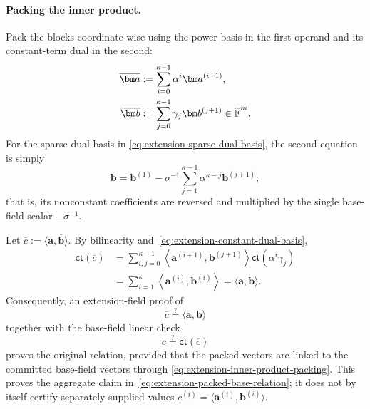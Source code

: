 \documentclass[runningheads]{llncs}
\begin{document}
\paragraph{Packing the inner product.}
Pack the blocks coordinate-wise using the power basis in the first
operand and its constant-term dual in the second:
\begin{equation}
\begin{aligned}
    \overline{\bm a}
      &:=\sum_{i=0}^{\kappa-1}
        \alpha^i\bm a^{(i+1)},\\
    \overline{\bm b}
      &:=\sum_{j=0}^{\kappa-1}
        \gamma_j\bm b^{(j+1)}
       \in\overline{\Field}^{m}.
\end{aligned}
\label{eq:extension-inner-product-packing}
\end{equation}
For the sparse dual basis in
\eqref{eq:extension-sparse-dual-basis}, the second equation is simply
\[
    \overline{\bm b}
      =\bm b^{(1)}
       -\sigma^{-1}
        \sum_{j=1}^{\kappa-1}
        \alpha^{\kappa-j}\bm b^{(j+1)};
\]
that is, its nonconstant coefficients are reversed and multiplied by
the single base-field scalar \(-\sigma^{-1}\).

Let
\(\overline c:=\langle\overline{\bm a},\overline{\bm b}\rangle\).
By bilinearity and~\eqref{eq:extension-constant-dual-basis},
\begin{equation}
\begin{aligned}
    \mathsf{ct}(\overline c)
      &=\sum_{i,j=0}^{\kappa-1}
        \left\langle
          \bm a^{(i+1)},\bm b^{(j+1)}
        \right\rangle
        \mathsf{ct}(\alpha^i\gamma_j)\\
      &=\sum_{i=1}^{\kappa}
        \left\langle\bm a^{(i)},\bm b^{(i)}\right\rangle
       =\langle\bm a,\bm b\rangle.
\end{aligned}
\label{eq:extension-inner-product-constant-term}
\end{equation}
Consequently, an extension-field proof of
\[
    \overline c
      \stackrel{?}{=}
      \langle\overline{\bm a},\overline{\bm b}\rangle
\]
together with the base-field linear check
\[
    c\stackrel{?}{=}\mathsf{ct}(\overline c)
\]
proves the original relation, provided that the packed vectors are
linked to the committed base-field vectors through
\eqref{eq:extension-inner-product-packing}.  This proves the aggregate
claim in~\eqref{eq:extension-packed-base-relation}; it does not by
itself certify separately supplied values
\(c^{(i)}=\langle\bm a^{(i)},\bm b^{(i)}\rangle\).
\end{document}
